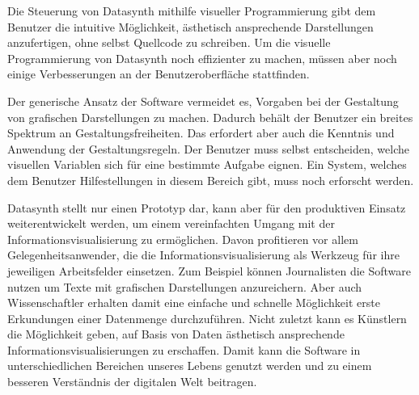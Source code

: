 \documentclass[a4paper, 
               12pt,
               DIV=calc,
               version=first,
               pdftex,
               headsepline,
               footsepline,
               bibliography=totocnumbered,
               listof=numbered]{scrreprt}
\begin{document}
Die Steuerung von Datasynth mithilfe visueller Programmierung gibt dem Benutzer
die intuitive Möglichkeit, ästhetisch ansprechende Darstellungen
anzufertigen, ohne selbst Quellcode zu schreiben. Um die visuelle
Programmierung von Datasynth noch effizienter zu machen, müssen aber
noch einige Verbesserungen an der Benutzeroberfläche stattfinden.

Der generische Ansatz der Software vermeidet es, Vorgaben bei der Gestaltung von
grafischen Darstellungen zu machen. Dadurch behält der Benutzer ein breites Spektrum an Gestaltungsfreiheiten.
Das erfordert aber auch die Kenntnis und Anwendung der Gestaltungsregeln.
Der Benutzer muss selbst entscheiden, welche visuellen Variablen sich für eine
bestimmte Aufgabe eignen. Ein System, welches dem
Benutzer Hilfestellungen in diesem Bereich gibt, muss noch erforscht werden.

Datasynth stellt nur einen Prototyp dar, kann aber für den
produktiven Einsatz weiterentwickelt werden, um einem vereinfachten Umgang mit
der Informationsvisualisierung zu ermöglichen. Davon profitieren vor allem Gelegenheitsanwender,
die die Informationsvisualisierung als Werkzeug für ihre jeweiligen Arbeitsfelder
einsetzen. Zum Beispiel können Journalisten die Software nutzen um Texte
mit grafischen Darstellungen anzureichern. Aber auch Wissenschaftler
erhalten damit eine einfache und schnelle Möglichkeit
erste Erkundungen einer Datenmenge durchzuführen. Nicht zuletzt kann es Künstlern
die Möglichkeit geben, auf Basis von Daten ästhetisch ansprechende
Informationsvisualisierungen zu erschaffen. Damit kann die Software in unterschiedlichen
Bereichen unseres Lebens genutzt werden und zu einem besseren
Verständnis der digitalen Welt beitragen.
\end{document}

